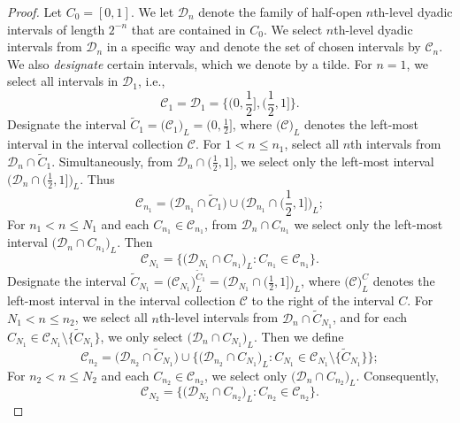 \documentclass[12pt]{article}
\newcommand{\1}{{\bf 1}}
\begin{document}
\begin{proof}
		Let $C_0=[0,1]$. 
		We  let $\mathcal{D}_n$ denote the family of  half-open $n$th-level dyadic intervals of length $2^{-n}$ that are contained in $C_0$. 
		We select   $n$th-level dyadic intervals from  $\mathcal{D}_n$ in a specific way and denote the set of chosen intervals by $\mathcal{C}_n$. We also {\it designate} certain intervals, which we denote by a tilde.
		For $n=1$, we select all   intervals in $\mathcal{D}_1$, i.e., 
		$$\mathcal{C}_1=\mathcal{D}_1=\big\{(0,\textstyle{\frac{1}{2}}],(\textstyle{\frac{1}{2}},1]\big\}.$$ 
		Designate the interval  $\widetilde{C}_{1}=\big(\mathcal{C}_1\big)_L=(0,\frac{1}{2}]$, where  $\big(\mathcal{C}\big)_L$ denotes
		the  left-most interval in the   interval collection $\mathcal{C}$.
		 For $1<n\leq n_1$,  select all  $n$th intervals from  $\mathcal{D}_n\cap \widetilde{C}_{1}$.
		Simultaneously, from   $\mathcal{D}_n\cap (\frac{1}{2},1]$, we select only the  left-most interval $\big(\mathcal{D}_n\cap (\frac{1}{2},1]\big)_L$. 
		Thus $$\mathcal{C}_{n_1} =\big(\mathcal{D}_{n_1}\cap \widetilde{C}_{1}\big)\cup\big(\mathcal{D}_{n_1}\cap (\textstyle{\frac{1}{2}},1]\big)_L;$$ 
		For $n_1<n\leq N_1$ and  each $C_{n_1}\in\mathcal{C}_{n_1}$,  from $\mathcal{D}_n\cap C_{n_1}$  we select only the  left-most interval $\big(\mathcal{D}_n\cap C_{n_1}\big)_L$.
		Then
		\begin{equation*}
			\mathcal{C}_{N_1}=\Big\{\big(\mathcal{D}_{N_1}\cap {C}_{n_1}\big)_L:{C}_{n_1}\in\mathcal{C}_{n_1}\Big\}.
		\end{equation*}
		Designate  the interval  $\widetilde{C}_{N_1}=\big(\mathcal{C}_{N_1}\big)_L^{\widetilde{C}_{1}}=\big(\mathcal{D}_{N_1}\cap (\frac{1}{2},1]\big)_L$,
		where $\big(\mathcal{C}\big)_L^C$ denotes the  left-most interval  in the interval collection $\mathcal{C}$  to the right of the interval $C$.
		For $N_1<n\leq n_2$, we select all  $n$th-level intervals from $\mathcal{D}_n\cap \widetilde{C}_{N_1}$, and for each $C_{N_1}\in\mathcal{C}_{N_1}\setminus\{\widetilde{C}_{N_1}\}$, we only  select $\big(\mathcal{D}_n\cap {C}_{N_1}\big)_L$. Then we define  
		\begin{equation*}
			\mathcal{C}_{n_2}=\big(\mathcal{D}_{n_2}\cap \widetilde{C}_{N_1}\big)\cup\Big\{\big(\mathcal{D}_{n_2}\cap {C}_{N_1}\big)_L:{C}_{N_1}\in\mathcal{C}_{N_1}\setminus\{\widetilde{C}_{N_1}\}\Big\};
		\end{equation*}
		For $n_2<n\leq N_2$  and    each $C_{n_2}\in \mathcal{C}_{n_2}$, we  select only  $\big(\mathcal{D}_n\cap {C}_{n_2}\big)_L$.
	Consequently,
		\begin{equation*}
			\mathcal{C}_{N_2}=\Big\{\big(\mathcal{D}_{N_2}\cap {C}_{n_2}\big)_L:{C}_{n_2}\in\mathcal{C}_{n_2}\Big\}.
		\end{equation*}
		

\end{proof}
\end{document}
